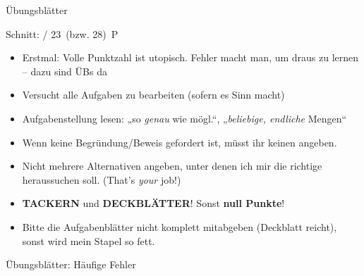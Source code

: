 




\graphicspath{{../figures/}}

\morescalingdelimiters



\begin{frame}{Übungsblätter}
	
	Schnitt:  / 23~(bzw. 28)~P
	
	\begin{itemize}
		\item Erstmal: Volle Punktzahl ist utopisch. Fehler macht man, um draus zu lernen – dazu sind ÜBs da
		\item Versucht alle Aufgaben zu bearbeiten (sofern es Sinn macht)
		\item Aufgabenstellung lesen: „so \emph{genau} wie mögl.“, „\emph{beliebige, endliche} Mengen“
		\item Wenn keine Begründung/Beweis gefordert ist, müsst ihr keinen angeben.
		\item Nicht mehrere Alternativen angeben, unter denen ich mir die richtige heraussuchen soll. (That's \emph{your} job!)
		\item \textbf{TACKERN} und \textbf{DECKBLÄTTER}! Sonst \alert{\textbf{null Punkte}}!
		\item Bitte die Aufgabenblätter nicht komplett mitabgeben (Deckblatt reicht), sonst wird mein Stapel so fett. \smiley
	\end{itemize}
	
\end{frame}

\begin{frame}[t]{Übungsblätter: Häufige Fehler }
	
	
	\medskip

	
\end{frame}

